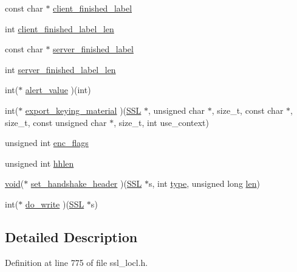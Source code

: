 \begin{DoxyCompactItemize}
\item 
const char $\ast$ \hyperlink{structssl3__enc__method_a48e32e660cde6a4ee9b64dd2f19a1628}{client\+\_\+finished\+\_\+label}
\item 
int \hyperlink{structssl3__enc__method_acdd0fc227179637d4744ad9fc30ceb70}{client\+\_\+finished\+\_\+label\+\_\+len}
\item 
const char $\ast$ \hyperlink{structssl3__enc__method_a12d8403aa75b0b1f78cde6576b6607fd}{server\+\_\+finished\+\_\+label}
\item 
int \hyperlink{structssl3__enc__method_a6820eb0b97a5acbeb21f08b4b4395d57}{server\+\_\+finished\+\_\+label\+\_\+len}
\item 
int($\ast$ \hyperlink{structssl3__enc__method_a9483b870873a31ad97354d81ea6d740f}{alert\+\_\+value} )(int)
\item 
int($\ast$ \hyperlink{structssl3__enc__method_a7aa367911e64007691d15195f16ccdd7}{export\+\_\+keying\+\_\+material} )(\hyperlink{crypto_2ossl__typ_8h_a71f21e09bf365489dab9d85bd4785e24}{S\+SL} $\ast$, unsigned char $\ast$, size\+\_\+t, const char $\ast$, size\+\_\+t, const unsigned char $\ast$, size\+\_\+t, int use\+\_\+context)
\item 
unsigned int \hyperlink{structssl3__enc__method_ac939f8a119299e9cc64f39eb5b9a5af9}{enc\+\_\+flags}
\item 
unsigned int \hyperlink{structssl3__enc__method_a58669083084f3291a52519bee866eb85}{hhlen}
\item 
\hyperlink{hw__4758__cca_8h_afad4d591c7931ff6dc5bf69c76c96aa0}{void}($\ast$ \hyperlink{structssl3__enc__method_ae4c379df536e6bf70625d353e244f752}{set\+\_\+handshake\+\_\+header} )(\hyperlink{crypto_2ossl__typ_8h_a71f21e09bf365489dab9d85bd4785e24}{S\+SL} $\ast$s, int \hyperlink{include_2openssl_2x509_8h_ab512b8f495325c7ea0f5a5a5d3f938eb}{type}, unsigned long \hyperlink{include_2openssl_2x509_8h_ad8c3db4434e9cb5cd772cc009f40e856}{len})
\item 
int($\ast$ \hyperlink{structssl3__enc__method_a7f2e7196bc342230282f597cc6299996}{do\+\_\+write} )(\hyperlink{crypto_2ossl__typ_8h_a71f21e09bf365489dab9d85bd4785e24}{S\+SL} $\ast$s)
\end{DoxyCompactItemize}


\subsection{Detailed Description}


Definition at line 775 of file ssl\+\_\+locl.\+h.



